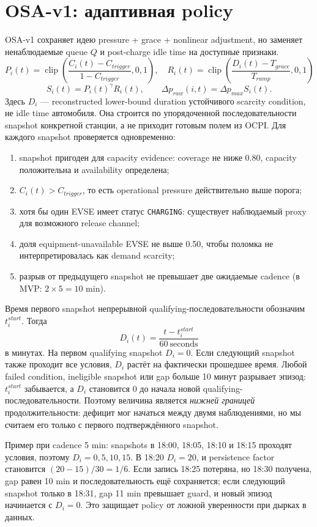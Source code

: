 \documentclass[11pt,a4paper]{article}
\newcommand{\code}[1]{\texttt{#1}}
\begin{document}
\section{OSA-v1: адаптивная policy}
OSA-v1 сохраняет идею pressure + grace + nonlinear adjustment, но заменяет ненаблюдаемые queue $Q$ и post-charge idle time на доступные признаки.
\[
P_i(t)=\operatorname{clip}\!\left(\frac{C_i(t)-C_{trigger}}{1-C_{trigger}},0,1\right),
\quad
R_i(t)=\operatorname{clip}\!\left(\frac{D_i(t)-T_{grace}}{T_{ramp}},0,1\right)
\]
\[
S_i(t)=P_i(t)^{\gamma}R_i(t),\qquad
\Delta p_{raw}(i,t)=\Delta p_{max}S_i(t).
\]
Здесь $D_i$ --- reconstructed lower-bound duration устойчивого scarcity condition, не idle time автомобиля. Она строится по упорядоченной последовательности snapshot конкретной станции, а не приходит готовым полем из OCPI. Для каждого snapshot проверяется одновременно:
\begin{enumerate}
\item snapshot пригоден для capacity evidence: coverage не ниже 0.80, capacity положительна и availability определена;
\item $C_i(t)>C_{trigger}$, то есть operational pressure действительно выше порога;
\item хотя бы один EVSE имеет статус \code{CHARGING}: существует наблюдаемый proxy для возможного release channel;
\item доля equipment-unavailable EVSE не выше 0.50, чтобы поломка не интерпретировалась как demand scarcity;
\item разрыв от предыдущего snapshot не превышает две ожидаемые cadence (в MVP: $2\times5=10$ min).
\end{enumerate}

Время первого snapshot непрерывной qualifying-последовательности обозначим $t_i^{start}$. Тогда
\[
D_i(t)=\frac{t-t_i^{start}}{60\ \text{seconds}}
\]
в минутах. На первом qualifying snapshot $D_i=0$. Если следующий snapshot также проходит все условия, $D_i$ растёт на фактически прошедшее время. Любой failed condition, ineligible snapshot или gap больше 10 минут разрывает эпизод: $t_i^{start}$ забывается, а $D_i$ становится 0 до начала новой qualifying-последовательности. Поэтому величина является \emph{нижней границей} продолжительности: дефицит мог начаться между двумя наблюдениями, но мы считаем его только с первого подтверждённого snapshot.

Пример при cadence 5 min: snapshots в 18:00, 18:05, 18:10 и 18:15 проходят условия, поэтому $D_i=0,5,10,15$. В 18:20 $D_i=20$, и persistence factor становится $(20-15)/30=1/6$. Если запись 18:25 потеряна, но 18:30 получена, gap равен 10 min и последовательность ещё сохраняется; если следующий snapshot только в 18:31, gap 11 min превышает guard, и новый эпизод начинается с $D_i=0$. Это защищает policy от ложной уверенности при дырках в данных.
\end{document}
